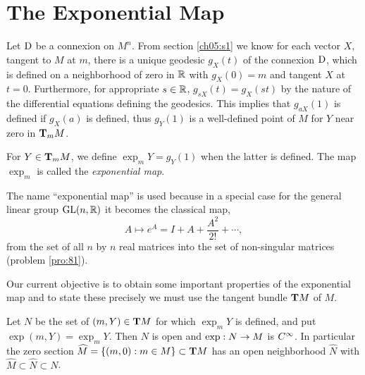 \documentclass[../main]{subfiles}
\begin{document}
\section{The Exponential Map}\label{ch09:s3}

Let $\D$ be a connexion on $M^n$. From section \ref{ch05:s1} we know for each vector $X$, tangent to $M$ at $m$, there is a unique geodesic $g_X(t)$ of the connexion $\D$, which is defined on a neighborhood of zero in $\bR$ with $g_X(0) = m$ and tangent $X$ at $t=0$. Furthermore, for appropriate $s \in \bR$, $g_{sX}(t) = g_X(st)$ by the nature of the differential equations defining the geodesics. This implies that $g_{aX}(1)$ is defined if $g_X(a)$ is defined, thus $g_Y(1)$ is a well-defined point of $M$ for $Y$ near zero in $\tangentspace{M}{m}$.

\begin{definition}
For $Y \in \tangentspace{M}{m}$, we define $\exp_mY=g_Y(1)$ when the latter is defined. The map $\exp_m$ is called the \emph{exponential map}. 
\end{definition}

The name ``exponential map'' is used because in a special case for the general linear group $\GL(n, \bR)$  it becomes the classical map,
\[ A \mapsto e^A = I + A + \frac{A^2}{2!} + \cdots ,\]
from the set of all $n$ by $n$ real matrices into the set of non-singular matrices (problem \ref{pro:81}).

Our current objective is to obtain some important properties of the exponential map and to state these precisely we must use the tangent bundle $\tangentbundle{M}$ of $M$.

\begin{proposition} \label{prop:ch9.3.1}
Let $N$ be the set of $(m,Y)\in\tangentbundle{M}$ for which $\exp_mY$ is defined, and put $\exp(m,Y)=\exp_mY$. Then $N$ is open and $\exp:N\functionMaps M$ is $\CInfty$. In particular the zero section $\widehat M=\{(m,0):m\in M\}\subset\tangentbundle{M}$ has an open neighborhood $\widehat N$ with $\widehat M\subset\widehat N\subset N$.
\end{proposition} \label{pro:CH09S3.1}
\end{document}
